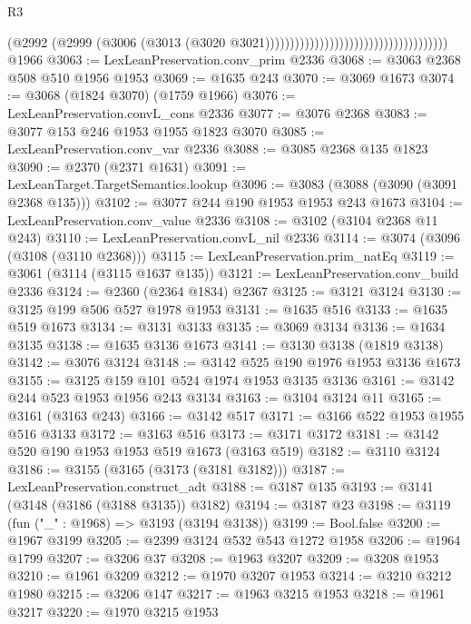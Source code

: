 \begin{lexlean}{R3}
\begin{coremodule}
                                                                    (@2992
                                                                      (@2999
                                                                        (@3006
                                                                          (@3013
                                                                            (@3020
                                                                              @3021)))))))))))))))))))))))))))))))))))))
    @1966
@3063 := LexLeanPreservation.conv_prim @2336
@3068 := @3063 @2368 @508 @510 @1956 @1953
@3069 := @1635 @243
@3070 := @3069 @1673
@3074 := @3068 (@1824 @3070) (@1759 @1966)
@3076 := LexLeanPreservation.convL_cons @2336
@3077 := @3076 @2368
@3083 := @3077 @153 @246 @1953 @1955 @1823 @3070
@3085 := LexLeanPreservation.conv_var @2336
@3088 := @3085 @2368 @135 @1823
@3090 := @2370 (@2371 @1631)
@3091 := LexLeanTarget.TargetSemantics.lookup
@3096 := @3083 (@3088 (@3090 (@3091 @2368 @135)))
@3102 := @3077 @244 @190 @1953 @1953 @243 @1673
@3104 := LexLeanPreservation.conv_value @2336
@3108 := @3102 (@3104 @2368 @11 @243)
@3110 := LexLeanPreservation.convL_nil @2336
@3114 := @3074 (@3096 (@3108 (@3110 @2368)))
@3115 := LexLeanPreservation.prim_natEq
@3119 := @3061 (@3114 (@3115 @1637 @135))
@3121 := LexLeanPreservation.conv_build @2336
@3124 := @2360 (@2364 @1834) @2367
@3125 := @3121 @3124
@3130 := @3125 @199 @506 @527 @1978 @1953
@3131 := @1635 @516
@3133 := @1635 @519 @1673
@3134 := @3131 @3133
@3135 := @3069 @3134
@3136 := @1634 @3135
@3138 := @1635 @3136 @1673
@3141 := @3130 @3138 (@1819 @3138)
@3142 := @3076 @3124
@3148 := @3142 @525 @190 @1976 @1953 @3136 @1673
@3155 := @3125 @159 @101 @524 @1974 @1953 @3135 @3136
@3161 := @3142 @244 @523 @1953 @1956 @243 @3134
@3163 := @3104 @3124 @11
@3165 := @3161 (@3163 @243)
@3166 := @3142 @517
@3171 := @3166 @522 @1953 @1955 @516 @3133
@3172 := @3163 @516
@3173 := @3171 @3172
@3181 := @3142 @520 @190 @1953 @1953 @519 @1673 (@3163 @519)
@3182 := @3110 @3124
@3186 := @3155 (@3165 (@3173 (@3181 @3182)))
@3187 := LexLeanPreservation.construct_adt
@3188 := @3187 @135
@3193 := @3141 (@3148 (@3186 (@3188 @3135)) @3182)
@3194 := @3187 @23
@3198 := @3119 (fun ("_" : @1968) => @3193 (@3194 @3138))
@3199 := Bool.false
@3200 := @1967 @3199
@3205 := @2399 @3124 @532 @543 @1272 @1958
@3206 := @1964 @1799
@3207 := @3206 @37
@3208 := @1963 @3207
@3209 := @3208 @1953
@3210 := @1961 @3209
@3212 := @1970 @3207 @1953
@3214 := @3210 @3212 @1980
@3215 := @3206 @147
@3217 := @1963 @3215 @1953
@3218 := @1961 @3217
@3220 := @1970 @3215 @1953

\end{coremodule}
\end{lexlean}
